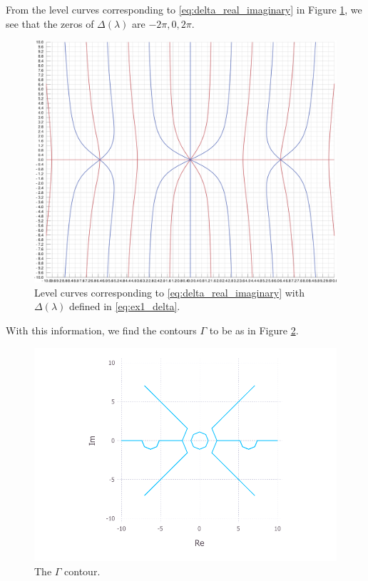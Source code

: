 \documentclass[12pt, oneside, a4paper]{article}
\begin{document}
From the level curves corresponding to \eqref{eq:delta_real_imaginary} in Figure \ref{fig:ex1_levelCurves}, we see that the zeros of $\Delta(\lambda)$ are $-2\pi, 0, 2\pi$.
\begin{figure}[htpb!]
    \centering
    \includegraphics[width=1\linewidth]{ex1_levelCurves.pdf}
    \caption{Level curves corresponding to \eqref{eq:delta_real_imaginary} with $\Delta(\lambda)$ defined in \eqref{eq:ex1_delta}.}
    \label{fig:ex1_levelCurves}
\end{figure}
With this information, we find the contours $\Gamma$ to be as in Figure \ref{fig:ex1_contourPlot}.
\begin{figure}[htpb!]
    \centering
    \includegraphics[width=1\linewidth]{ex1_contourPlot.pdf}
    \caption{The $\Gamma$ contour.}
    \label{fig:ex1_contourPlot}
\end{figure}
\end{document}
